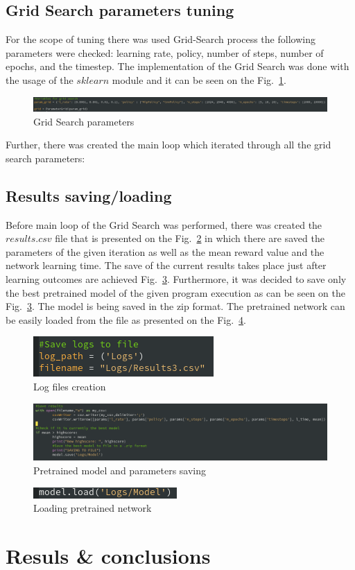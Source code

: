 \documentclass[runningheads]{llncs}
\begin{document}
\subsection{Grid Search parameters tuning}
For the scope of tuning there was used Grid-Search process the following parameters were checked:
learning rate, policy, number of steps, number of epochs, and the timestep.
The implementation of the Grid Search was done with the usage of the $sklearn$ module and it can be seen on the Fig.~\ref{fig0}.
\begin{figure}
  \centering
  \includegraphics[width=\textwidth]{Screenshots/grid.png}
\caption{Grid Search parameters} \label{fig0}
\end{figure}
Further, there was created the main loop which iterated through all the grid search parameters:

\subsection{Results saving/loading}
Before main loop of the Grid Search was performed, there was created the $results.csv$ file that is presented on the Fig.~\ref{fig2} in which there are saved the parameters of the given iteration as well as the mean reward value and the network learning time. The save of the current results takes place just after learning outcomes are achieved Fig.~\ref{fig1}. Furthermore, it was decided to save only the best pretrained model of the given program execution as can be seen on the Fig.~\ref{fig1}. The model is being saved in the zip format. The pretrained network can be easily loaded from the file as presented on the Fig.~\ref{fig3}.
\begin{figure}
  \centering
  \includegraphics{Screenshots/logs.png}
\caption{Log files creation} \label{fig2}
\end{figure}

\begin{figure}
  \centering
  \includegraphics[width=\textwidth]{Screenshots/save.png}
\caption{Pretrained model and parameters saving} \label{fig1}
\end{figure}

\begin{figure}
  \centering
  \includegraphics{Screenshots/load.png}
\caption{Loading pretrained network} \label{fig3}
\end{figure}


\section{Resuls \& conclusions}
\end{document}
